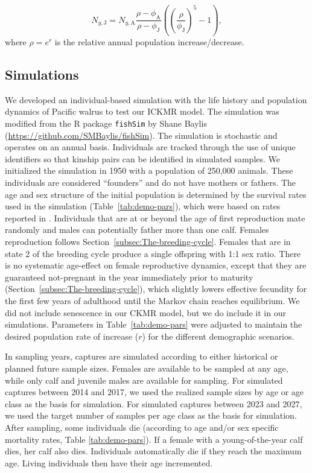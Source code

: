 \[
N_{y,\text{J}}=N_{y,\text{A}}\frac{\rho-\phi_{\text{A}}}{\rho-\phi_{\text{J}}}\left(\left(\frac{\rho}{\phi_{\text{J}}}\right)^{5}-1\right),
\]
where $\rho=e^{r}$ is the relative annual population increase/decrease.

\subsection{Simulations}

We developed an individual-based simulation with the life history
and population dynamics of Pacific walrus to test our ICKMR model.
The simulation was modified from the R package \texttt{fishSim} by
Shane Baylis (\url{https://github.com/SMBaylis/fishSim}). The simulation
is stochastic and operates on an annual basis. Individuals are tracked
through the use of unique identifiers so that kinship pairs can be
identified in simulated samples. We initialized the simulation in
1950 with a population of 250,000 animals. These individuals are considered
``founders'' and do not have mothers or fathers. The age and sex
structure of the initial population is determined by the survival
rates used in the simulation (Table~\ref{tab:demo-pars}), which
were based on rates reported in \citet{taylor_demography_2018}. Individuals
that are at or beyond the age of first reproduction mate randomly
and males can potentially father more than one calf. Females reproduction
follows Section~\ref{subsec:The-breeding-cycle}. Females that are
in state 2 of the breeding cycle produce a single offspring with 1:1
sex ratio. There is no systematic age-effect on female reproductive
dynamics, except that they are guaranteed not-pregnant in the year
immediately prior to maturity (Section~\ref{subsec:The-breeding-cycle}),
which slightly lowers effective fecundity for the first few years
of adulthood until the Markov chain reaches equilibrium. We did not
include senescence in our CKMR model, but we do include it in our
simulations. Parameters in Table~\ref{tab:demo-pars} were adjusted
to maintain the desired population rate of increase ($r$) for the
different demographic scenarios.

In sampling years, captures are simulated according to either historical
or planned future sample sizes. Females are available to be sampled
at any age, while only calf and juvenile males are available for sampling.
For simulated captures between 2014 and 2017, we used the realized
sample sizes by age or age class as the basis for simulation. For
simulated captures between 2023 and 2027, we used the target number
of samples per age class as the basis for simulation. After sampling,
some individuals die (according to age and/or sex specific mortality
rates, Table \ref{tab:demo-pars}). If a female with a young-of-the-year
calf dies, her calf also dies. Individuals automatically die if they
reach the maximum age. Living individuals then have their age incremented.

